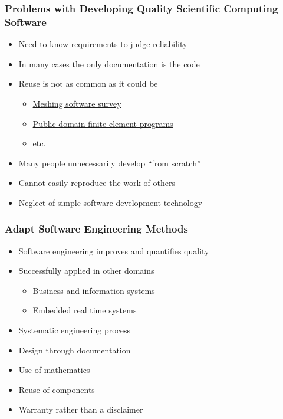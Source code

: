 \documentclass[t,12pt,numbers,fleqn]{beamer}
\begin{document}

\begin{frame}

\frametitle{Problems with Developing Quality Scientific Computing Software}

\begin{itemize}

\item Need to know requirements to judge reliability
\item In many cases the only documentation is the code
\item Reuse is not as common as it could be
\begin{itemize}
\item \href{http://www.andrew.cmu.edu/user/sowen/softsurv.html}{\alert{Meshing software survey}}
\item \href{http://www.engr.usask.ca/~macphed/finite/fe_resources/node137.html}{\alert{Public domain finite element
programs}}
\item etc.
\end{itemize}
\item Many people unnecessarily develop ``from scratch''~\cite{Dubois2002}
\item Cannot easily reproduce the work of others
\item Neglect of simple software development technology~\cite{Wilson2006} 

\end{itemize}

\end{frame}


\begin{frame}

\frametitle{Adapt Software Engineering Methods}

\begin{itemize}

\item Software engineering improves and quantifies quality %
\item Successfully applied in other domains
\begin{itemize}
\item Business and information systems
\item Embedded real time systems
\end{itemize}
\item Systematic engineering process
\item Design through documentation
\item Use of mathematics
\item Reuse of components
\item Warranty rather than a disclaimer %

\end{itemize}

\end{frame}
\end{document}
